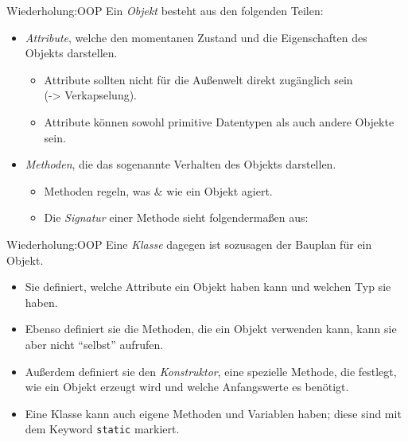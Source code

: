 \begin{frame}{Wiederholung:OOP}
    Ein \textit{Objekt} besteht aus den folgenden Teilen:
    \begin{itemize}[<+->]
        \item \textit{Attribute}, welche den momentanen Zustand und die Eigenschaften des Objekts darstellen. 
            \begin{itemize}
                \item Attribute sollten nicht für die Außenwelt direkt zugänglich sein \\ (-> Verkapselung). 
                \item Attribute können sowohl primitive Datentypen als auch andere Objekte sein.
            \end{itemize}
        \item \textit{Methoden}, die das sogenannte Verhalten des Objekts darstellen.
            \begin{itemize}
                \item Methoden regeln, was \& wie ein Objekt agiert.
                \item Die \textit{Signatur} einer Methode sieht folgendermaßen aus: \\
            \end{itemize}
    \end{itemize}
\end{frame}

\begin{frame}{Wiederholung:OOP}
    Eine \textit{Klasse} dagegen ist sozusagen der Bauplan für ein Objekt.
    \begin{itemize}[<+->]
        \item Sie definiert, welche Attribute ein Objekt haben kann und welchen Typ sie haben.
        \item Ebenso definiert sie die Methoden, die ein Objekt verwenden kann, kann sie aber nicht \enquote{selbst} aufrufen.
        \item Außerdem definiert sie den \textit{Konstruktor}, eine spezielle Methode, die festlegt, 
            wie ein Objekt erzeugt wird und welche Anfangswerte es benötigt.
        \item Eine Klasse kann auch eigene Methoden und Variablen haben; diese sind mit dem Keyword \texttt{static} markiert.
    \end{itemize}
\end{frame}

